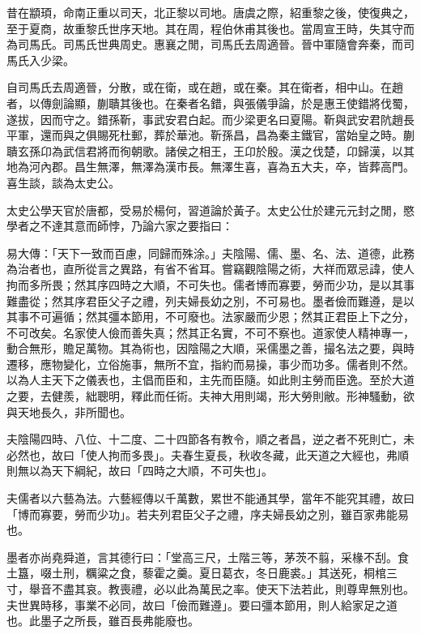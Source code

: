 
\begin{pinyinscope}
昔在顓頊，命南正重以司天，北正黎以司地。唐虞之際，紹重黎之後，使復典之，至于夏商，故重黎氏世序天地。其在周，程伯休甫其後也。當周宣王時，失其守而為司馬氏。司馬氏世典周史。惠襄之閒，司馬氏去周適晉。晉中軍隨會奔秦，而司馬氏入少梁。

自司馬氏去周適晉，分散，或在衛，或在趙，或在秦。其在衛者，相中山。在趙者，以傳劍論顯，蒯聵其後也。在秦者名錯，與張儀爭論，於是惠王使錯將伐蜀，遂拔，因而守之。錯孫靳，事武安君白起。而少梁更名曰夏陽。靳與武安君阬趙長平軍，還而與之俱賜死杜郵，葬於華池。靳孫昌，昌為秦主鐵官，當始皇之時。蒯聵玄孫卬為武信君將而徇朝歌。諸侯之相王，王卬於殷。漢之伐楚，卬歸漢，以其地為河內郡。昌生無澤，無澤為漢市長。無澤生喜，喜為五大夫，卒，皆葬高門。喜生談，談為太史公。

太史公學天官於唐都，受易於楊何，習道論於黃子。太史公仕於建元元封之閒，愍學者之不達其意而師悖，乃論六家之要指曰：

易大傳：「天下一致而百慮，同歸而殊涂。」夫陰陽、儒、墨、名、法、道德，此務為治者也，直所從言之異路，有省不省耳。嘗竊觀陰陽之術，大祥而眾忌諱，使人拘而多所畏；然其序四時之大順，不可失也。儒者博而寡要，勞而少功，是以其事難盡從；然其序君臣父子之禮，列夫婦長幼之別，不可易也。墨者儉而難遵，是以其事不可遍循；然其彊本節用，不可廢也。法家嚴而少恩；然其正君臣上下之分，不可改矣。名家使人儉而善失真；然其正名實，不可不察也。道家使人精神專一，動合無形，贍足萬物。其為術也，因陰陽之大順，采儒墨之善，撮名法之要，與時遷移，應物變化，立俗施事，無所不宜，指約而易操，事少而功多。儒者則不然。以為人主天下之儀表也，主倡而臣和，主先而臣隨。如此則主勞而臣逸。至於大道之要，去健羨，絀聰明，釋此而任術。夫神大用則竭，形大勞則敝。形神騷動，欲與天地長久，非所聞也。

夫陰陽四時、八位、十二度、二十四節各有教令，順之者昌，逆之者不死則亡，未必然也，故曰「使人拘而多畏」。夫春生夏長，秋收冬藏，此天道之大經也，弗順則無以為天下綱紀，故曰「四時之大順，不可失也」。

夫儒者以六藝為法。六藝經傳以千萬數，累世不能通其學，當年不能究其禮，故曰「博而寡要，勞而少功」。若夫列君臣父子之禮，序夫婦長幼之別，雖百家弗能易也。

墨者亦尚堯舜道，言其德行曰：「堂高三尺，土階三等，茅茨不翦，采椽不刮。食土簋，啜土刑，糲粱之食，藜霍之羹。夏日葛衣，冬日鹿裘。」其送死，桐棺三寸，舉音不盡其哀。教喪禮，必以此為萬民之率。使天下法若此，則尊卑無別也。夫世異時移，事業不必同，故曰「儉而難遵」。要曰彊本節用，則人給家足之道也。此墨子之所長，雖百長弗能廢也。


\end{pinyinscope}
